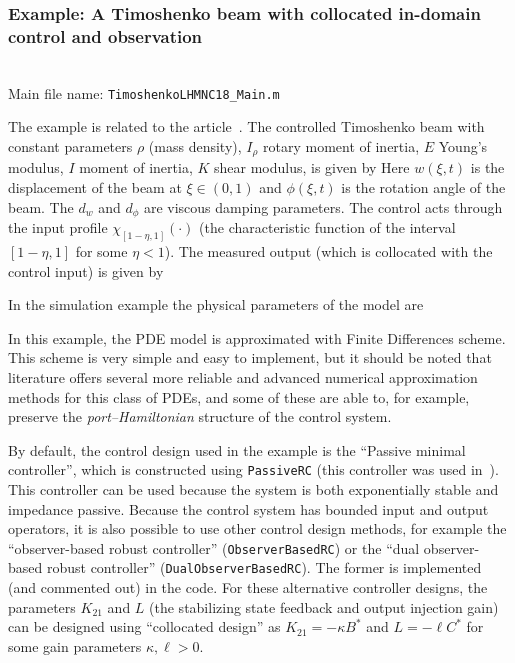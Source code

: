\documentclass[11pt, a4paper]{amsart}
\theoremstyle{definition}
\numberwithin{equation}{section}
\begin{document}
\medskip

\subsubsection*{Example: A Timoshenko beam with collocated in-domain control and observation}
~\\[-1ex]

\noindent Main file name: \texttt{TimoshenkoLHMNC18\_Main.m}

\medskip

The example is related to the article~\cite{PauLeG22}.
The controlled Timoshenko beam with constant parameters $\rho$ (mass density), $I_\rho$ rotary moment of inertia, $E$  Young's modulus, $I$ moment of inertia, $K$ shear modulus, is given by
Here $w(\xi,t)$ is the displacement of the beam at $\xi\in(0,1)$ and $\phi(\xi,t)$ is the rotation angle of the beam. The $d_w$ and $d_\phi$ are viscous damping parameters. 
The control acts through the input profile $\chi_{[1-\eta,1]}(\cdot)$ (the characteristic function of the interval $[1-\eta,1]$ for some $\eta<1$).
The measured output (which is collocated with the control input) is given by

In the simulation example the physical parameters of the model are 

In this example, the PDE model is approximated with Finite Differences scheme. This scheme is very simple and easy to implement, but it should be noted that literature offers several more reliable and advanced numerical approximation methods for this class of PDEs, and some of these are able to, for example, preserve the \emph{port--Hamiltonian} structure of the control system.

By default, the control design used in the example is the ``Passive minimal controller'', which is constructed using \texttt{PassiveRC} (this controller was used in~\cite{PauLeGLHMNC18}). This controller can be used because the system is both exponentially stable and impedance passive.
Because the control system has bounded input and output operators, it is also possible to use other control design methods, for example the ``observer-based robust controller'' (\texttt{ObserverBasedRC}) or the ``dual observer-based robust controller'' (\texttt{DualObserverBasedRC}). The former is implemented (and commented out) in the code. For these alternative controller designs, the parameters $K_{21}$ and $L$ (the stabilizing state feedback and output injection gain) can be designed using ``collocated design'' as $K_{21} = -\kappa B^\ast$ and $L=-\ell C^\ast$ for some gain parameters $\kappa,\ell>0$.
\end{document}

